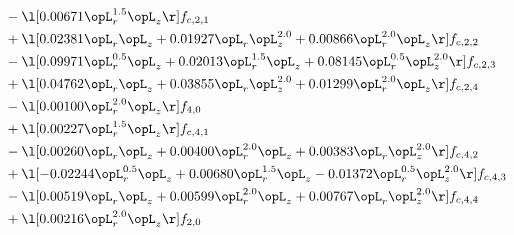 \begin{alignat}{2}
& - \l[  0.00671 \opL_r^{1.5} \opL_z  \r] f_{c,2,1} \nonumber \\ 
& + \l[  0.02381 \opL_r \opL_z +  0.01927 \opL_r \opL_z^{2.0} +  0.00866 \opL_r^{2.0} \opL_z  \r] f_{c,2,2} \nonumber \\ 
& - \l[  0.09971 \opL_r^{0.5} \opL_z +  0.02013 \opL_r^{1.5} \opL_z +  0.08145 \opL_r^{0.5} \opL_z^{2.0}  \r] f_{c,2,3} \nonumber \\ 
& + \l[  0.04762 \opL_r \opL_z +  0.03855 \opL_r \opL_z^{2.0} +  0.01299 \opL_r^{2.0} \opL_z  \r] f_{c,2,4} \nonumber \\ 
& - \l[  0.00100 \opL_r^{2.0} \opL_z  \r] f_{4,0} \nonumber \\ 
& + \l[  0.00227 \opL_r^{1.5} \opL_z  \r] f_{c,4,1} \nonumber \\ 
& - \l[  0.00260 \opL_r \opL_z +  0.00400 \opL_r^{2.0} \opL_z +  0.00383 \opL_r \opL_z^{2.0}  \r] f_{c,4,2} \nonumber \\ 
& + \l[  -0.02244 \opL_r^{0.5} \opL_z +  0.00680 \opL_r^{1.5} \opL_z   -0.01372 \opL_r^{0.5} \opL_z^{2.0}  \r] f_{c,4,3} \nonumber \\ 
& - \l[  0.00519 \opL_r \opL_z +  0.00599 \opL_r^{2.0} \opL_z +  0.00767 \opL_r \opL_z^{2.0}  \r] f_{c,4,4} \nonumber \\ 
& + \l[  0.00216 \opL_r^{2.0} \opL_z  \r] f_{2,0} \nonumber \\ 
\end{alignat} 


